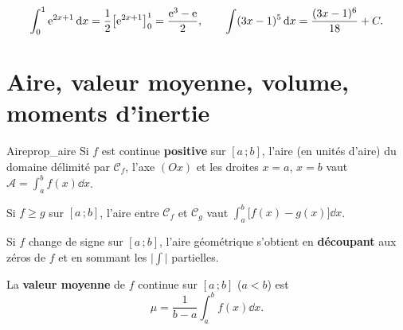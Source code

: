 \begin{exemple}
	\[
	\int_0^1\mathrm{e}^{2x+1}\,\mathrm{d} x=\frac12\bigl[\mathrm{e}^{2x+1}\bigr]_0^1=\frac{\mathrm{e}^{3}-\mathrm{e}}{2},
	\qquad
	\int (3x-1)^{5}\,\mathrm{d} x=\frac{(3x-1)^{6}}{18}+C.
	\]
\end{exemple}


\section{Aire, valeur moyenne, volume, moments d'inertie}

\begin{propriete}{Aire}{prop_aire}
	Si $f$ est continue \textbf{positive} sur $[a\,;b]$, l'aire (en unités
	d'aire) du domaine délimité par $\mathcal C_f$, l'axe $(Ox)$ et les droites
	$x=a$, $x=b$ vaut $\displaystyle\mathcal A=\int_a^b f(x)\dd x$.

	Si $f\geq g$ sur $[a\,;b]$, l'aire entre $\mathcal C_f$ et $\mathcal C_g$
	vaut $\displaystyle\int_a^b\bigl[f(x)-g(x)\bigr]\dd x$.
\end{propriete}

\begin{center}
\end{center}

\begin{attention}
	Si $f$ change de signe sur $[a\,;b]$, l'aire géométrique s'obtient en
	\textbf{découpant} aux zéros de $f$ et en sommant les $\bigl|\int\bigr|$
	partielles.
\end{attention}

\begin{definition}
	La \textbf{valeur moyenne} de $f$ continue sur $[a\,;b]$ ($a<b$) est
	\[
	\mu=\frac{1}{b-a}\int_a^b f(x)\dd x.
	\]
\end{definition}

